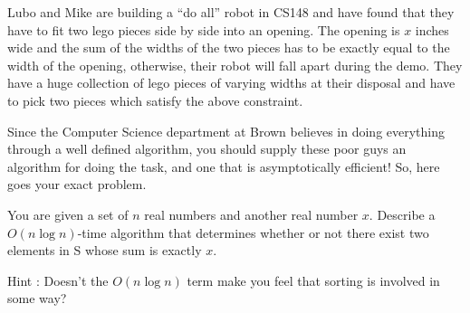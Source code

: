 Lubo and Mike are building a ``do all'' robot in CS148 and have found
that they have to fit two lego pieces side by side into an
opening. The opening is $x$ inches wide and the sum of the widths of
the two pieces has to be exactly equal to the width of the opening,
otherwise, their robot will fall apart during the demo. They have a
huge collection of lego pieces of varying widths at their disposal and
have to pick two pieces which satisfy the above constraint.

Since the Computer Science department at Brown believes in doing
everything through a well defined algorithm, you should supply these
poor guys an algorithm for doing the task, and one that is
asymptotically efficient!  So, here goes your exact problem.

You are given a set of $n$ real numbers and another real number $x$. 
Describe a $O(n\log  n)$-time algorithm that determines whether or
not there exist two elements in S whose sum is exactly $x$.

Hint : Doesn't the $O(n\log  n)$ term make you feel that sorting is
involved in some way?




